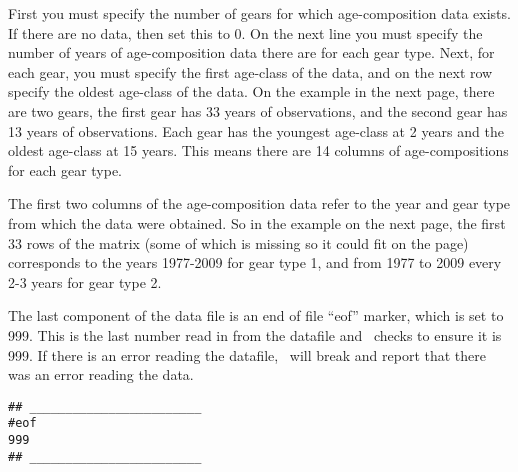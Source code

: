 \begin{multicols}{2}
First you must specify the number of gears for which age-composition data exists.  If there are no data, then set this to 0. On  the next line you must specify the number of years of age-composition data there are for each gear type.  Next, for each gear, you must specify the first age-class of the data, and on the next row specify the oldest age-class of the data.  On the example in the next page, there are two gears, the first gear has 33 years of observations, and the second gear has 13 years of observations.  Each gear has the youngest age-class at 2 years and the oldest age-class at 15 years.  This means there are 14 columns of age-compositions for each gear type.  

The first two columns of the age-composition data refer to the year and gear type from which the data were obtained.  So in the example on the next page, the first 33 rows of the matrix (some of which is missing so it could fit on the page) corresponds to the years 1977-2009 for gear type 1, and from 1977 to 2009 every 2-3 years for gear type 2.  

The last component of the data file is an end of file ``eof'' marker, which is set to 999.  This is the last number read in from the datafile and \iscam\ checks to ensure it is 999.  If there is an error reading the datafile, \iscam\ will break and report that there was an error reading the data.


\begin{verbatim}
## ________________________
#eof
999
## ________________________
\end{verbatim}

\end{multicols}
